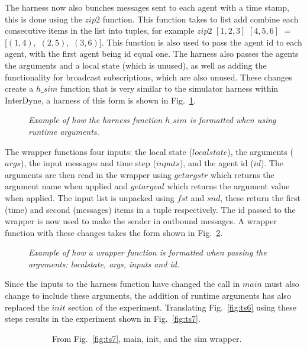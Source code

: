 \documentclass{article}
\begin{document}
The harness now also bunches messages sent to each agent with a time stamp, this is done using the $zip2$ function. This function takes to list add combine each consecutive items in the list into tuples, for example $zip2$ $[1,2,3]$ $[4,5,6]$ $=$ $[(1,4),$ $(2,5),$ $(3,6)]$. This function is also used to pass the agent id to each agent, with the first agent being id equal one. The harness also passes the agents the arguments and a local state (which is unused), as well as adding the functionality for broadcast subscriptions, which are also unused. These changes create a $h\_sim$ function that is very similar to the simulator harness within InterDyne, a harness of this form is shown in Fig.~\ref{fig:harn7}.  
\begin{figure}[H]
	\centering
	
	\caption{\it Example of how the harness function $h\_sim$ is formatted when using runtime arguments.}
	\label{fig:harn7}
\end{figure} 

The wrapper functions four inputs: the local state ($localstate$), the arguments ($args$), the input messages and time step ($inputs$), and the agent id ($id$). The arguments are then read in the wrapper using $getargstr$ which returns the argument name when applied and $getargval$ which returns the argument value when applied. The input list is unpacked using $fst$ and $snd$, these return the first (time) and second (messages) items in a tuple respectively. The id passed to the wrapper is now used to make the sender in outbound messages. A wrapper function with these changes takes the form shown in Fig.~\ref{fig:wrap7}. 
\begin{figure}[H]
	\centering
	
	\caption{\it Example of how a wrapper function is formatted when passing the arguments: localstate, args, inputs and id.}
	\label{fig:wrap7}
\end{figure} 

Since the inputs to the harness function have changed the call in $main$ must also change to include these arguments, the addition of runtime arguments has also replaced the $init$ section of the experiment. Translating Fig.~\ref{fig:ts6} using these steps results in the experiment shown in Fig.~\ref{fig:ts7}.
\begin{figure}[H]
	\centering
	\begin{subfigure}[b]{1\textwidth}
	
	\caption{From Fig.~\ref{fig:ts7}, main, init, and the sim wrapper.}
        \label{fig:ts71}
	\end{subfigure}
	\caption*{}
\end{figure}
	
\end{document}
